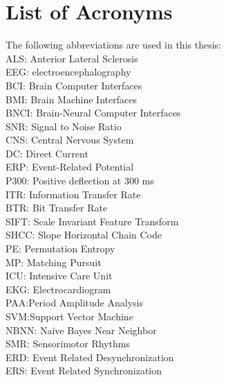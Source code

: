 \chapter*{List of Acronyms}

The following abbreviations are used in this thesis:\\

\noindent ALS: Anterior Lateral Sclerosis\\
EEG: electroencephalography\\
BCI: Brain Computer Interfaces\\
BMI: Brain Machine Interfaces\\
BNCI: Brain-Neural Computer Interfaces\\
SNR: Signal to Noise Ratio\\
CNS: Central Nervous System\\
DC: Direct Current\\
ERP: Event-Related Potential\\
P300: Positive deflection at 300 ms\\
ITR: Information Transfer Rate\\
BTR: Bit Transfer Rate\\
SIFT: Scale Invariant Feature Transform\\
SHCC: Slope Horizontal Chain Code\\
PE: Permutation Entropy\\
MP: Matching Pursuit\\
ICU: Intensive Care Unit\\
EKG: Electrocardiogram\\
PAA:Period Amplitude Analysis\\
SVM:Support Vector Machine\\
NBNN: Naive Bayes Near Neighbor\\
SMR: Sensorimotor Rhythms\\
ERD: Event Related Desynchronization\\
ERS: Event Related Synchronization

